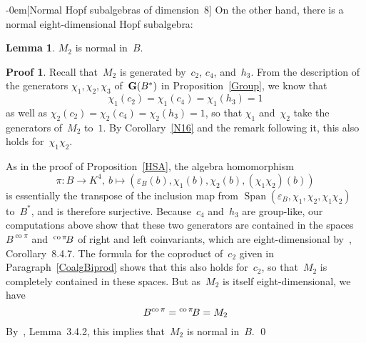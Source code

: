 \documentclass{article}
\makeatletter
\renewcommand{\subsection}{\@startsection{subsection}{2}{0em}%
{\baselineskip}{-0em}{\bfseries\normalsize}}
\numberwithin{equation}{section}
\theoremstyle{definition}
\newtheorem*{lem}{Lemma}
\newtheorem*{pf}{Proof}
\theoremstyle{break}
\newcommand{\Span}{\operatorname{Span}}
\newcommand{\co}{\scriptstyle \operatorname{co}}
\newcommand{\K}{1}
\newcommand{\1}{{(1)}}
\newcommand{\2}{{(2)}}
\newcommand{\3}{{(3)}}
\newcommand{\eb}{{\varepsilon_{B}}}
\makeatother
\begin{document}
\subsection[Normal Hopf subalgebras of dimension~$8$]{} \label{normal8}
On the other hand, there is a normal eight-dimensional Hopf subalgebra:
\begin{lem}
$M_2$ is normal in~$B$.
\end{lem}
\begin{pf}
Recall that~$M_2$ is generated by~$c_2$, $c_4$, and~$h_3$. From the description of the generators $\chi_1, \chi_2, \chi_3$ of~${\bf G}(B^*)$ in Proposition~\ref{Group}, we know that
\[\chi_1(c_2) = \chi_1(c_4) = \chi_1(h_3) = \K\]
as well as $\chi_2(c_2) = \chi_2(c_4) = \chi_2(h_3) = \K$, so that $\chi_1$ and~$\chi_2$ take the generators of~$M_2$ to~$\K$. By Corollary~\ref{N16} and the remark following it, this also holds for~$\chi_1 \chi_2$.

As in the proof of Proposition~\ref{HSA}, the algebra homomorphism
\[\pi \colon B \to K^4,~b \mapsto (\eb(b), \chi_1(b), \chi_2(b), (\chi_1 \chi_2)(b))\]
is essentially the transpose of the inclusion map from
$\Span(\eb, \chi_1, \chi_2, \chi_1 \chi_2)$ to~$B^*$, and is therefore surjective. Because~$c_4$ and~$h_3$ are group-like, our computations above show that these two generators are contained in the spaces~$B^{\co \pi}$ and~$\prescript{\co \pi}{} \!B$ of right and left coinvariants, which are eight-dimensional by~\cite{M}, Corollary~8.4.7. The formula for the coproduct of~$c_2$ given in Paragraph~\ref{CoalgBiprod} shows that this also holds for~$c_2$, so that~$M_2$ is completely contained in these spaces. But as~$M_2$ is itself eight-dimensional, we have 
\[B^{\co \pi} = \prescript{\co \pi}{} \!B = M_2\]
By~\cite{M}, Lemma~3.4.2, this implies that~$M_2$ is normal in~$B$.
\qed
\end{pf}
\end{document}
